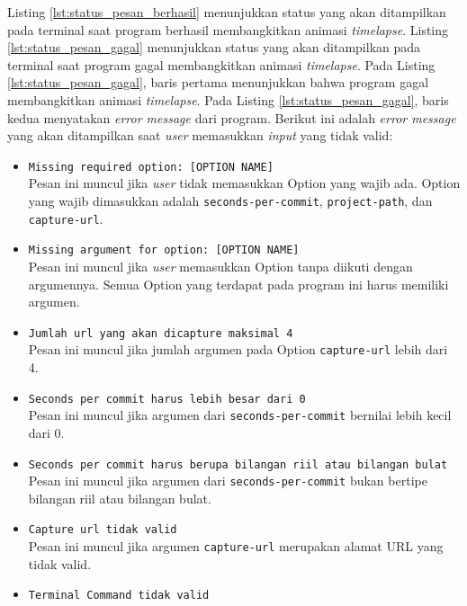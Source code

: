 Listing \ref{lst:status_pesan_berhasil} menunjukkan status yang akan ditampilkan pada terminal saat program berhasil membangkitkan animasi \textit{timelapse}. Listing \ref{lst:status_pesan_gagal} menunjukkan status yang akan ditampilkan pada terminal saat program gagal membangkitkan animasi \textit{timelapse}. Pada Listing \ref{lst:status_pesan_gagal}, baris pertama menunjukkan bahwa program gagal membangkitkan animasi \textit{timelapse}. Pada Listing \ref{lst:status_pesan_gagal}, baris kedua menyatakan \textit{error message} dari program. Berikut ini adalah \textit{error message} yang akan ditampilkan saat \textit{user} memasukkan \textit{input} yang tidak valid:
\begin{itemize}
\item \texttt{Missing required option: [OPTION NAME]}\\
Pesan ini muncul jika \textit{user} tidak memasukkan Option yang wajib ada. Option yang wajib dimasukkan adalah \texttt{seconds-per-commit}, \texttt{project-path}, dan \texttt{capture-url}.
\item \texttt{Missing argument for option: [OPTION NAME]}\\
Pesan ini muncul jika \textit{user} memasukkan Option tanpa diikuti dengan argumennya. Semua Option yang terdapat pada program ini harus memiliki argumen.
\item \texttt{Jumlah url yang akan dicapture maksimal 4}\\
Pesan ini muncul jika jumlah argumen pada Option \texttt{capture-url} lebih dari 4.
\item \texttt{Seconds per commit harus lebih besar dari 0}\\
Pesan ini muncul jika argumen dari \texttt{seconds-per-commit} bernilai lebih kecil dari 0.
\item \texttt{Seconds per commit harus berupa bilangan riil atau bilangan bulat}\\
Pesan ini muncul jika argumen dari \texttt{seconds-per-commit} bukan bertipe bilangan riil atau bilangan bulat. 
\item \texttt{Capture url tidak valid}\\
Pesan ini muncul jika argumen \texttt{capture-url} merupakan alamat URL yang tidak valid.
\item \texttt{Terminal Command tidak valid}

\end{itemize}
